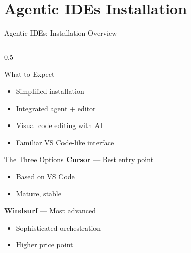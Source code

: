 \documentclass[aspectratio=169,11pt]{beamer}
\begin{document}
\section{Agentic IDEs Installation}

\begin{frame}{Agentic IDEs: Installation Overview}
    \begin{columns}[T]
        \begin{column}{0.5\textwidth}
            \begin{block}{What to Expect}
                \begin{itemize}
                    \item Simplified installation
                    \item Integrated agent + editor
                    \item Visual code editing with AI
                    \item Familiar VS Code-like interface
                \end{itemize}
            \end{block}

            \begin{block}{The Three Options}
                \textbf{Cursor} --- Best entry point
                \begin{itemize}
                    \item Based on VS Code
                    \item Mature, stable
                \end{itemize}

                \textbf{Windsurf} --- Most advanced
                \begin{itemize}
                    \item Sophisticated orchestration
                    \item Higher price point
                \end{itemize}


\end{block}
\end{column}
\end{columns}
\end{frame}
\end{document}
